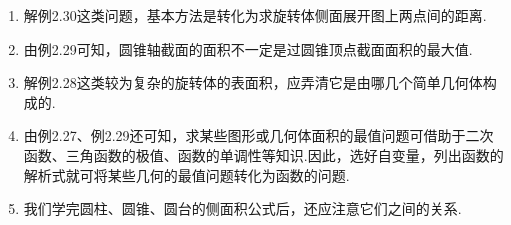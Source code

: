 \begin{remark}
\begin{enumerate}
    \item  解例2.30这类问题，基本方法是转化为求旋转体侧面展开图上两点间的距离.
    \item  由例2.29可知，圆锥轴截面的面积不一定是过圆锥顶点截面面积的最大值.
    \item  解例2.28这类较为复杂的旋转体的表面积，应弄清它是由哪几个简单几何体构成的.
    \item  由例2.27、例2.29还可知，求某些图形或几何体面积的最值问题可借助于二次函数、三角函数的极值、函数的单调性等知识.因此，选好自变量，列出函数的解析式就可将某些几何的最值问题转化为函数的问题.
    \item  我们学完圆柱、圆锥、圆台的侧面积公式后，还应注意它们之间的关系.
\begin{center}
\end{center}
\end{enumerate}
\end{remark}

